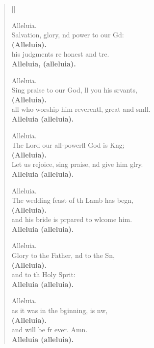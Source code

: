 \settowidth{\versewidth}{all who worship him reverently, great and small   *}
\begin{verse}[\versewidth]
  \begin{patverse}
Alleluia.\\
Salvation, glory, nd power to our Gd:\Med\\
\textbf{(Alleluia).}\\
his judgments re honest and tre.\Med\\
\textbf{Alleluia, (alleluia).}

Alleluia.\\
Sing praise to our God, ll you his srvants,\Med\\
\textbf{(Alleluia).}\\
all who worship him reverentl, great and smll.\Med\\
\textbf{Alleluia (alleluia).}

Alleluia.\\
The Lord our all-powerfl God is K\pointup{\i}ng;\Med\\
\textbf{(Alleluia).}\\
Let us rejoice, sing praise, nd give him glry.\Med\\
\textbf{Alleluia (alleluia).}

Alleluia.\\
The wedding feast of th Lamb has begn,\Med\\
\textbf{(Alleluia).}\\
and his bride is prpared to wlcome him.\Med\\
\textbf{Alleluia (alleluia).}

Alleluia.\\
Glory to the Father, nd to the Sn,\Med\\
\textbf{(Alleluia).}\\
and to th Holy Sp\pointup{\i}rit:\Med\\
\textbf{Alleluia (alleluia).}

Alleluia.\\
as it was in the bginning, is nw,\Med\\
\textbf{(Alleluia).}\\
and will be fr ever. Amn.\Med\\
\textbf{Alleluia (alleluia).}
  \end{patverse}
  \end{verse}
